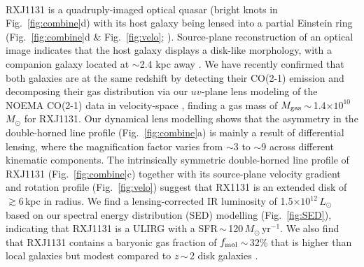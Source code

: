 \documentclass[11pt,a4paper,twoside,graphicx,color]{article}
\newcommand{\Lsun}{\mbox{$L_{\odot}$}\xspace}
\newcommand{\LIR}{\mbox{$L_{\rm IR}$}\xspace}
\newcommand{\Msun}{\mbox{$M_{\odot}$}\xspace}
\newcommand{\sfrU}{\mbox{\Msun\,yr$^{-1}$}\xspace}
\newcommand{\bco}{\mbox{CO(2-1)}\xspace}
\newcommand{\Fig}[1]{Fig.~\ref{fig:#1}}
\newcommand{\E}[1]{\mbox{$\times10^{#1}$}}
\newcommand{\eq}{\,=\,}
\newcommand{\ssim}{\,$\sim$\,}
\begin{document}
\vspace{0.2em}
\\
\indent
RXJ1131 is a quadruply-imaged optical quasar (bright knots in \Fig{combine}d)
with its host galaxy being lensed
into a partial Einstein ring (\Fig{combine}d \& \Fig{velo}; \citealt{Sluse03a}).
Source-plane reconstruction
of an optical image indicates that the host galaxy displays a disk-like morphology, with
a companion galaxy located at $\sim$2.4 kpc away
\citep[\Fig{combine}f;][]{Claeskens06a, Brewer08a}.
We have recently confirmed that both galaxies are at the same redshift by detecting their
\bco emission and decomposing their gas distribution
via our $uv$-plane lens modeling
of the NOEMA \bco data
 in velocity-space \citep[\Fig{combine}c \& e;][]{Leung16b}, finding a gas mass of
$M_{\rm gas}$\ssim1.4\E{10}\,\Msun for RXJ1131.
Our dynamical lens modelling
shows that the asymmetry in the double-horned line profile (\Fig{combine}a)
is mainly a result of differential lensing, where
the magnification factor varies from $\sim$3 to $\sim$9 across
different kinematic components.
The intrinsically symmetric double-horned line
profile of RXJ1131 (\Fig{combine}c) together with its source-plane velocity gradient
and rotation profile (\Fig{velo})
suggest that RX1131 is an extended disk of $\gtrsim$6\,kpc in radius.
We find a lensing-corrected IR luminosity of 1.5\E{12}\,\Lsun based
on our spectral energy distribution (SED) modelling (\Fig{SED}),
indicating that RXJ1131 is a ULIRG with a SFR\ssim120\,\sfrU.
We also find that
RXJ1131 contains
a baryonic gas fraction of $f_{\rm mol}$\ssim32\%
that is higher than local galaxies but modest compared to $z$\ssim2 disk galaxies \citep{Daddi10a}.
\end{document}
